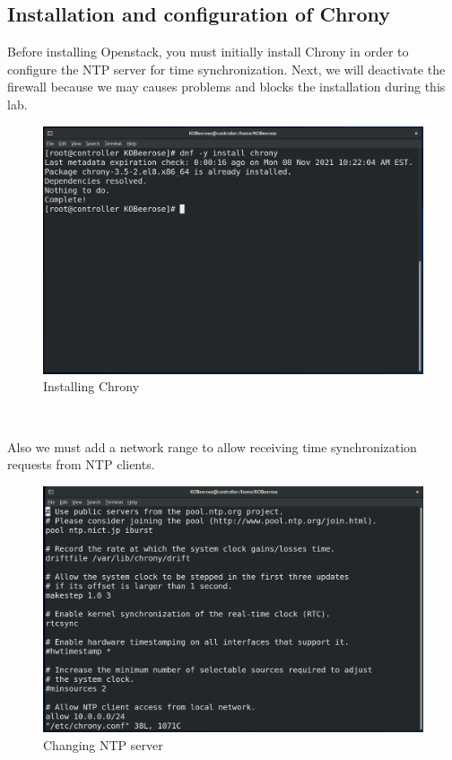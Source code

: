 \begin{spacing}{1.2}
\section{Installation and configuration of Chrony}

\par Before installing Openstack, you must initially install Chrony in order to configure the NTP server for time synchronization. Next, we will deactivate the firewall because we may causes problems and blocks the installation during this lab.
\\

\begin{figure}[!htb] 
\begin{center} 
\includegraphics[width=1\linewidth]{Cloud/Config/Installing Chrony} 
\end{center} 
\caption{Installing Chrony} 
\end{figure} \FloatBarrier

\\
\par Also we must add a network range to allow receiving time synchronization requests from NTP clients.
\\
\begin{figure}[!htb] 
\begin{center} 
\includegraphics[width=1\linewidth]{Cloud/Config/Changing NTP server} 
\end{center} 
\caption{Changing NTP server} 
\end{figure}  \FloatBarrier
\\



\end{spacing}
